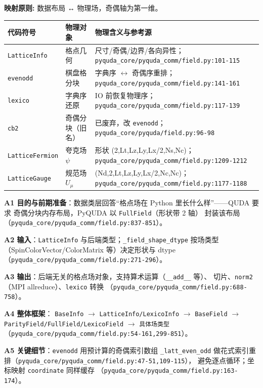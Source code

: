 \documentclass[UTF8]{ctexart}
\begin{document}
\begin{mapbox}
\textbf{映射原则:} 数据布局 ↔ 物理场，奇偶轴为第一维。
\end{mapbox}
\begin{xltabular}{\textwidth}{llX}
\toprule
\textcolor{map}{代码符号} & 物理对象 & 物理含义与参考源 \\
\midrule
\endhead
\texttt{LatticeInfo} & 格点几何 & 尺寸/奇偶/边界/各向异性；
\texttt{\nolinkurl{pyquda_core/pyquda_comm/field.py:101-115}} \\
\texttt{evenodd} & 棋盘格分块 & 字典序 $\leftrightarrow$ 奇偶序重排；
\texttt{\nolinkurl{pyquda_core/pyquda_comm/field.py:141-161}} \\
\texttt{lexico} & 字典序还原 & IO 前恢复物理序；
\texttt{\nolinkurl{pyquda_core/pyquda_comm/field.py:117-139}} \\
\texttt{cb2} & 奇偶分块（旧名） & 已废弃，改 \texttt{evenodd}；
\texttt{\nolinkurl{pyquda_core/pyquda/field.py:96-98}} \\
\texttt{LatticeFermion} & 夸克场 $\psi$ & 形状 (2,Lt,Lz,Ly,Lx/2,Ns,Nc)；
\texttt{\nolinkurl{pyquda_core/pyquda_comm/field.py:1209-1212}} \\
\texttt{LatticeGauge} & 规范场 $U_\mu$ & (Nd,2,Lt,Lz,Ly,Lx/2,Nc,Nc)；
\texttt{\nolinkurl{pyquda_core/pyquda_comm/field.py:1177-1188}} \\
\bottomrule
\end{xltabular}

\textbf{A1 目的与前期准备}：数据类层回答“格点场在 Python 里长什么样”——QUDA 要求
奇偶分块内存布局，PyQUDA 以 \texttt{FullField}（形状带 2 轴）
封装该布局（\texttt{\nolinkurl{pyquda_core/pyquda_comm/field.py:837-851}}）。

\textbf{A2 输入}：\texttt{LatticeInfo} 与后端类型；\texttt{\_field\_shape\_dtype}
按场类型（SpinColorVector/ColorMatrix 等）决定形状与 dtype
（\texttt{\nolinkurl{pyquda_core/pyquda_comm/field.py:271-296}}）。

\textbf{A3 输出}：后端无关的格点场对象，支持算术运算（\texttt{\_\_add\_\_} 等）、
切片、\texttt{norm2}（MPI allreduce）、\texttt{lexico} 转换
（\texttt{\nolinkurl{pyquda_core/pyquda_comm/field.py:688-758}}）。

\textbf{A4 整体框架}：
\texttt{BaseInfo} $\rightarrow$
\texttt{\nolinkurl{LatticeInfo/LexicoInfo}} $\rightarrow$ \texttt{BaseField}
$\rightarrow$ \texttt{\nolinkurl{ParityField/FullField/LexicoField}}
$\rightarrow$ \texttt{具体场类型}
（\texttt{\nolinkurl{pyquda_core/pyquda_comm/field.py:54-161,299-851}}）。

\textbf{A5 关键细节}：\texttt{evenodd} 用预计算的奇偶索引数组
\texttt{\_latt\_even\_odd} 做花式索引重排（\texttt{\nolinkurl{pyquda_core/pyquda_comm/field.py:47-51,109-115}}），
避免逐点循环；坐标映射 \texttt{coordinate} 同样缓存
（\texttt{\nolinkurl{pyquda_core/pyquda_comm/field.py:163-174}}）。
\end{document}
